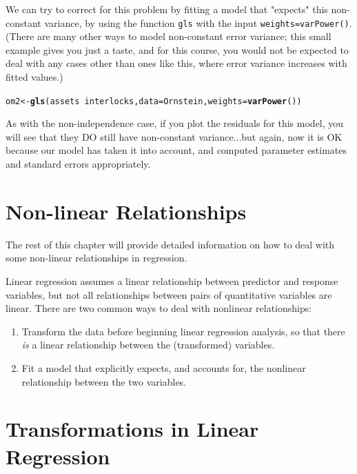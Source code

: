 \documentclass[twoside]{book}\usepackage[]{graphicx}\usepackage[]{xcolor}
\makeatletter
\newcommand{\hlopt}[1]{\textcolor[rgb]{0,0,0}{#1}}%
\newcommand{\hlstd}[1]{\textcolor[rgb]{0.345,0.345,0.345}{#1}}%
\newcommand{\hlkwb}[1]{\textcolor[rgb]{0.69,0.353,0.396}{#1}}%
\newcommand{\hlkwc}[1]{\textcolor[rgb]{0.333,0.667,0.333}{#1}}%
\newcommand{\hlkwd}[1]{\textcolor[rgb]{0.737,0.353,0.396}{\textbf{#1}}}%
\newenvironment{kframe}{%
 \def\at@end@of@kframe{}%
 \ifinner\ifhmode%
  \def\at@end@of@kframe{\end{minipage}}%
  \begin{minipage}{\columnwidth}%
 \fi\fi%
 \def\FrameCommand##1{\hskip\@totalleftmargin \hskip-\fboxsep
 \colorbox{shadecolor}{##1}\hskip-\fboxsep
     \hskip-\linewidth \hskip-\@totalleftmargin \hskip\columnwidth}%
 \MakeFramed {\advance\hsize-\width
   \@totalleftmargin\z@ \linewidth\hsize
   \@setminipage}}%
 {\par\unskip\endMakeFramed%
 \at@end@of@kframe}
\newenvironment{knitrout}{}{} %
\def\myindex#1{\index{#1}}
\newcounter{example}[section]
\makeatother
\begin{document}
We can try to correct for this problem by fitting a model that "expects" this non-constant variance, by using the function \texttt{gls} with the input \texttt{weights=varPower()}.  (There are many other ways to model non-constant error variance; this small example gives you just a taste, and for this course, you would not be expected to deal with any cases other than ones like this, where error variance increases with fitted values.)
\begin{knitrout}
\color{fgcolor}\begin{kframe}
\begin{alltt}
\hlstd{om2} \hlkwb{<-} \hlkwd{gls}\hlstd{(assets} \hlopt{~}\hlstd{interlocks,} \hlkwc{data}\hlstd{=Ornstein,} \hlkwc{weights}\hlstd{=}\hlkwd{varPower}\hlstd{())}
\end{alltt}
\end{kframe}
\end{knitrout}

As with the non-independence case, if you plot the residuals for this model, you will see that they DO still have non-constant variance...but again, now it is OK because our model has taken it into account, and computed parameter estimates and standard errors appropriately.

\section{Non-linear Relationships}
The rest of this chapter will provide detailed information on how to deal with some non-linear relationships in regression.

Linear regression assumes a linear relationship between predictor and response variables, but not all relationships between pairs of quantitative variables are linear.  There are two common ways to deal with
nonlinear relationships:
\begin{enumerate}
	\item
		Transform the data before beginning linear regression analysis, so that there \emph{is} a linear relationship between the (transformed) variables.
	\item
		Fit a model that explicitly expects, and accounts for, the nonlinear relationship between the two variables. 
\end{enumerate}


\section{Transformations in Linear Regression}
\myindex{transformation!of data}%
\end{document}

